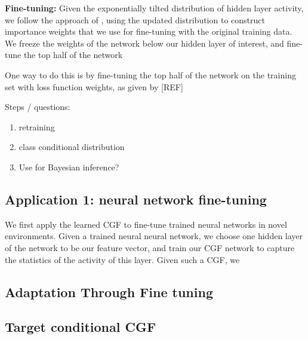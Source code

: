 \documentclass[10pt]{article}      %
\begin{document}
\noindent \textbf{Fine-tuning:} Given the exponentially tilted distribution of hidden layer activity, we follow the approach of \cite{maity_understanding_2023}, using the updated distribution to construct importance weights that we use for fine-tuning with the original training data.
We freeze the weights of the network below our hidden layer of interest, and fine-tune the top half of the network 





One way to do this is by fine-tuning the top half of the network on the training set with loss function weights, as given by [REF]



Steps / questions:
\begin{enumerate}
  \item retraining
  \item class conditional distribution
  \item Use for Bayesian inference?
\end{enumerate}









\newpage
\subsection{Application 1: neural network fine-tuning}

We first apply the learned CGF to fine-tune trained neural networks in novel environments.
Given a trained neural neural network, we choose one hidden layer of the network to be our feature vector, and train our CGF network to capture the statistics of the activity of this layer.
Given such a CGF, we










\newpage
\subsection{Adaptation Through Fine tuning}





\subsection{Target conditional CGF}
\end{document}
